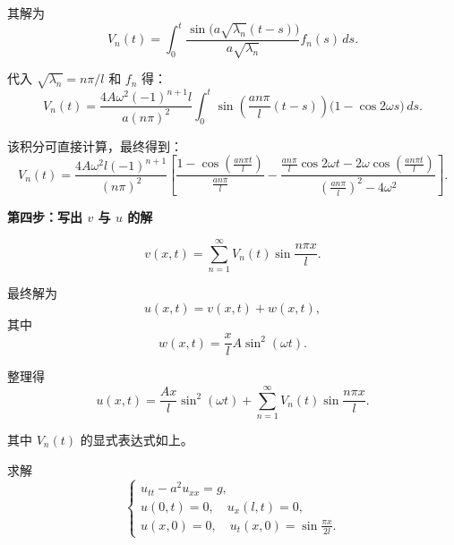 \begin{solution}
其解为
\[
V_n(t)=\int_0^{t} \frac{\sin\big(a\sqrt{\lambda_n}(t-s)\big)}{a\sqrt{\lambda_n}}
f_n(s)\,ds.
\]

代入 $\sqrt{\lambda_n}=n\pi/l$ 和 $f_n$ 得：
\[
V_n(t)=\frac{4A\omega^{2}(-1)^{n+1}l}{a(n\pi)^2}
\int_0^{t}\sin\!\left(\frac{an\pi}{l}(t-s)\right)
\bigl(1-\cos 2\omega s\bigr)\,ds.
\]

该积分可直接计算，最终得到：
\[
V_n(t)=
\frac{4A\omega^{2}l(-1)^{n+1}}{(n\pi)^{2}}
\left[
\frac{1-\cos\left(\frac{an\pi t}{l}\right)}{\frac{an\pi}{l}}
-
\frac{
\frac{an\pi}{l}\cos 2\omega t -2\omega\cos\left(\frac{an\pi t}{l}\right)
}{\left(\frac{an\pi}{l}\right)^{2}-4\omega^{2}}
\right].
\]

\medskip
\noindent\textbf{第四步：写出 $v$ 与 $u$ 的解}

\[
v(x,t)=\sum_{n=1}^{\infty} V_n(t)\sin\frac{n\pi x}{l}.
\]

最终解为
\[
u(x,t)=v(x,t)+w(x,t),
\]
其中
\[
w(x,t)=\frac{x}{l}A\sin^{2}(\omega t).
\]

整理得
\[
\boxed{
u(x,t)=\frac{Ax}{l}\sin^{2}(\omega t)
+\sum_{n=1}^{\infty} V_n(t)\sin\frac{n\pi x}{l}
}.
\]

其中 $V_n(t)$ 的显式表达式如上。

\end{solution}
\begin{homework}
[4]求解
\[
\begin{cases}
u_{tt}-a^{2}u_{xx}=g,\\[3pt]
u(0,t)=0,\quad u_x(l,t)=0,\\[3pt]
u(x,0)=0,\quad u_t(x,0)=\sin\frac{\pi x}{2l}.
\end{cases}
\]
\end{homework}

